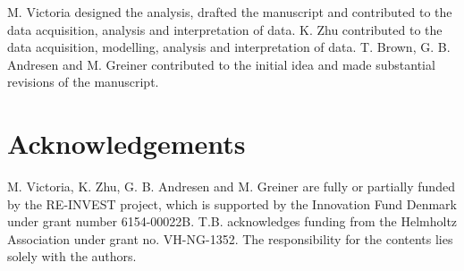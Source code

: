 \documentclass[5p]{elsarticle} %
\begin{document}
M. Victoria designed the analysis, drafted the manuscript and contributed to the data acquisition, analysis and interpretation of data. K. Zhu contributed to the data acquisition, modelling, analysis and interpretation of data. 
T. Brown, G. B. Andresen and M. Greiner contributed to the initial idea and made substantial revisions of the manuscript. 

\section{Acknowledgements}
M. Victoria, K. Zhu, G. B. Andresen and M. Greiner are fully or partially funded by the RE-INVEST project, which is supported by  the  Innovation  Fund  Denmark  under  grant  number  6154-00022B. T.B. acknowledges funding from the Helmholtz Association under grant no. VH-NG-1352. The responsibility for the contents lies solely with the authors.


\end{document}
